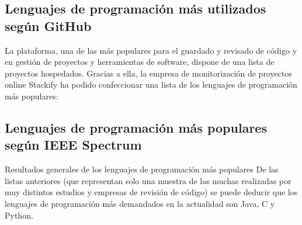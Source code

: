 \documentclass[12pt]{article}
\begin{document}
\subsection{Lenguajes de programación más utilizados según GitHub}
La plataforma, una de las más populares para el guardado y revisado de código y en gestión de proyectos y herramientas de software, dispone de una lista de proyectos hospedados. Gracias a ella, la empresa de monitorización de proyectos online Stackify ha podido confeccionar una lista de los lenguajes de programación más populares:

\begin{figure}[!h]
\end{figure}

\subsection{Lenguajes de programación más populares según IEEE Spectrum}

Resultados generales de los lenguajes de programación más populares
De las listas anteriores (que representan solo una muestra de las muchas realizadas por muy distintos estudios y empresas de revisión de código) se puede deducir que los lenguajes de programación más demandados en la actualidad son Java, C y Python.
\end{document}
